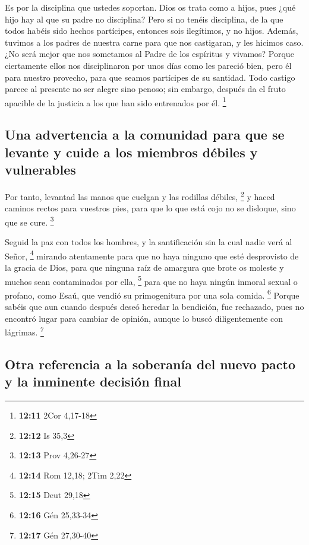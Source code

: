  Es por la disciplina que ustedes soportan. Dios os trata
como a hijos, pues ¿qué hijo hay al que su padre no disciplina?
 Pero si no tenéis disciplina, de la que todos habéis sido
hechos partícipes, entonces sois ilegítimos, y no hijos. 
Además, tuvimos a los padres de nuestra carne para que nos castigaran, y
les hicimos caso. ¿No será mejor que nos sometamos al Padre de los
espíritus y vivamos?  Porque ciertamente ellos nos
disciplinaron por unos días como les pareció bien, pero él para nuestro
provecho, para que seamos partícipes de su santidad. 
Todo castigo parece al presente no ser alegre sino penoso; sin embargo,
después da el fruto apacible de la justicia a los que han sido
entrenados por él. \footnote{\textbf{12:11} 2Cor 4,17-18}

\hypertarget{una-advertencia-a-la-comunidad-para-que-se-levante-y-cuide-a-los-miembros-duxe9biles-y-vulnerables}{%
\subsection{Una advertencia a la comunidad para que se levante y cuide a
los miembros débiles y
vulnerables}\label{una-advertencia-a-la-comunidad-para-que-se-levante-y-cuide-a-los-miembros-duxe9biles-y-vulnerables}}

 Por tanto, levantad las manos que cuelgan y las rodillas
débiles, \footnote{\textbf{12:12} Is 35,3}  y haced
caminos rectos para vuestros pies, para que lo que está cojo no se
disloque, sino que se cure. \footnote{\textbf{12:13} Prov 4,26-27}

 Seguid la paz con todos los hombres, y la santificación
sin la cual nadie verá al Señor, \footnote{\textbf{12:14} Rom 12,18;
  2Tim 2,22}  mirando atentamente para que no haya
ninguno que esté desprovisto de la gracia de Dios, para que ninguna raíz
de amargura que brote os moleste y muchos sean contaminados por ella,
\footnote{\textbf{12:15} Deut 29,18}  para que no haya
ningún inmoral sexual o profano, como Esaú, que vendió su primogenitura
por una sola comida. \footnote{\textbf{12:16} Gén 25,33-34}
 Porque sabéis que aun cuando después deseó heredar la
bendición, fue rechazado, pues no encontró lugar para cambiar de
opinión, aunque lo buscó diligentemente con lágrimas. \footnote{\textbf{12:17}
  Gén 27,30-40}

\hypertarget{otra-referencia-a-la-soberanuxeda-del-nuevo-pacto-y-la-inminente-decisiuxf3n-final}{%
\subsection{Otra referencia a la soberanía del nuevo pacto y la
inminente decisión
final}\label{otra-referencia-a-la-soberanuxeda-del-nuevo-pacto-y-la-inminente-decisiuxf3n-final}}

